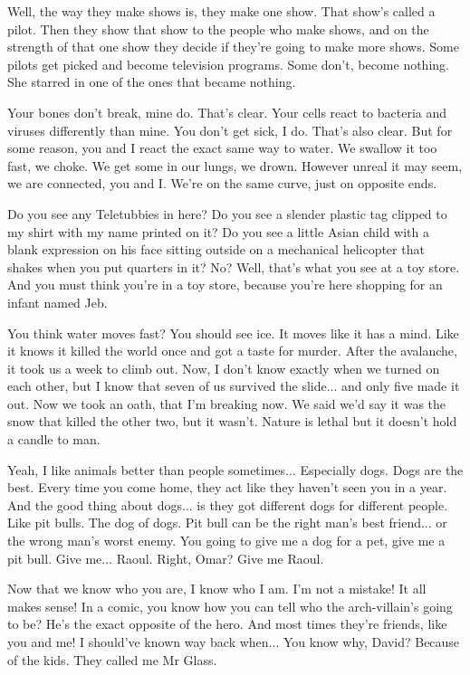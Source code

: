 \documentclass{book}
\begin{document}
Well, the way they make shows is, they make one show. That show's called a pilot. Then they show that show to the people who make shows, and on the strength of that one show they decide if they're going to make more shows. Some pilots get picked and become television programs. Some don't, become nothing. She starred in one of the ones that became nothing.

Your bones don't break, mine do. That's clear. Your cells react to bacteria and viruses differently than mine. You don't get sick, I do. That's also clear. But for some reason, you and I react the exact same way to water. We swallow it too fast, we choke. We get some in our lungs, we drown. However unreal it may seem, we are connected, you and I. We're on the same curve, just on opposite ends.

Do you see any Teletubbies in here? Do you see a slender plastic tag clipped to my shirt with my name printed on it? Do you see a little Asian child with a blank expression on his face sitting outside on a mechanical helicopter that shakes when you put quarters in it? No? Well, that's what you see at a toy store. And you must think you're in a toy store, because you're here shopping for an infant named Jeb.

You think water moves fast? You should see ice. It moves like it has a mind. Like it knows it killed the world once and got a taste for murder. After the avalanche, it took us a week to climb out. Now, I don't know exactly when we turned on each other, but I know that seven of us survived the slide... and only five made it out. Now we took an oath, that I'm breaking now. We said we'd say it was the snow that killed the other two, but it wasn't. Nature is lethal but it doesn't hold a candle to man.

Yeah, I like animals better than people sometimes... Especially dogs. Dogs are the best. Every time you come home, they act like they haven't seen you in a year. And the good thing about dogs... is they got different dogs for different people. Like pit bulls. The dog of dogs. Pit bull can be the right man's best friend... or the wrong man's worst enemy. You going to give me a dog for a pet, give me a pit bull. Give me... Raoul. Right, Omar? Give me Raoul.

Now that we know who you are, I know who I am. I'm not a mistake! It all makes sense! In a comic, you know how you can tell who the arch-villain's going to be? He's the exact opposite of the hero. And most times they're friends, like you and me! I should've known way back when... You know why, David? Because of the kids. They called me Mr Glass.
\end{document}
